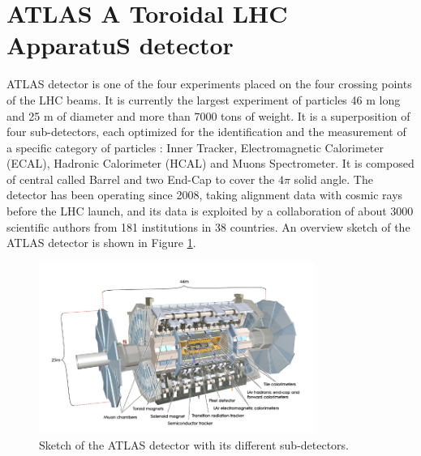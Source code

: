 \section{ATLAS A Toroidal LHC ApparatuS detector}
\label{chap2:ATLAS}
ATLAS detector is one of the four experiments placed on the four crossing points of the LHC beams. It is currently the largest experiment of particles 46 m long and 25 m of diameter and more than 7000 tons of weight. It is a superposition of four sub-detectors, each optimized for the identification and the measurement of a specific category of particles : Inner Tracker, Electromagnetic Calorimeter (ECAL), Hadronic Calorimeter  (HCAL) and Muons Spectrometer. It is composed of central called Barrel and two End-Cap to cover the $4\pi$ solid angle. The detector has been operating since 2008, taking alignment data with cosmic rays before the LHC launch, and its data is exploited by a collaboration of about 3000 scientific authors from 181 institutions in 38 countries. An overview sketch of the ATLAS detector is shown in Figure \ref{fig:chap2:ATLAS:Img}.
\begin{figure}[H]
    \centering
    \includegraphics[width=0.8\textwidth]{Ch2/Img/ATLAS_sketch.png}
    \caption{Sketch of the ATLAS detector with its different sub-detectors.}
    \label{fig:chap2:ATLAS:Img}
\end{figure}

